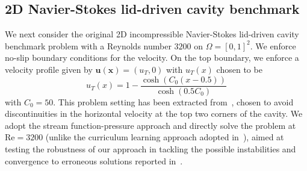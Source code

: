 \documentclass[oneside,reqno,11pt,a4paper]{amsart}
\theoremstyle{definition}
\begin{document}
\subsection{2D Navier-Stokes lid-driven cavity benchmark}
\label{sec:ns-ldc-aq}

We next consider the original
2D incompressible Navier-Stokes lid-driven cavity benchmark problem with a
Reynolds number $3200$ on $\Omega = [0,1]^2$. We enforce no-slip boundary conditions for the velocity. On the top boundary, we enforce a velocity profile given by 
$\pmb{u}(\pmb{x})=(u_T,0)$ with $u_T(x)$ chosen to be 
\begin{equation} \label{eq:ldc-top-profile}
    u_T(x) = 1 - \frac{\cosh{\left(C_0\left(x-0.5\right)\right)}}{\cosh{\left(0.5 C_0 \right)}}
\end{equation}
with $C_0=50$. This problem setting has been extracted from~\cite{PirateNets2024}, chosen to  
avoid discontinuities in the horizontal velocity at the top two corners of the cavity. 
We adopt the stream function-pressure approach and directly solve
the problem at $\mathrm{Re} = 3200$ (unlike the curriculum learning approach
\cite{PINNFailureModes2021} adopted in~\cite{PirateNets2024}), aimed at testing
the robustness of our approach in tackling the possible instabilities and
convergence to erroneous solutions reported in~\cite{Wang2023PINNsGuide,
Wang2023multiplicity}.
\end{document}
